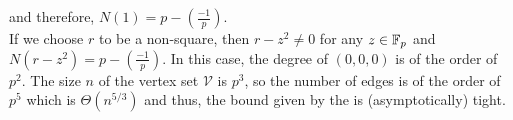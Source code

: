 \documentclass{article}
\begin{document}
		and therefore, $N(1) = p - \left(\frac{-1}{p}\right)$.\\
		If we choose $r$ to be a non-square, then $r-z^2 \neq 0$ for any $z\in\mathbb{F}_p$ and $N(r-z^2) = p - \left(\frac{-1}{p}\right)$. In this case, the degree of $(0,0,0)$ is of the order of $p^2$. The size $n$ of the vertex set $\mathcal{V}$ is $p^3$, so the number of edges is of the order of $p^5$ which is $\Theta(n^{5/3})$ and thus, the bound given by the  is (asymptotically) tight.
		
\end{document}
